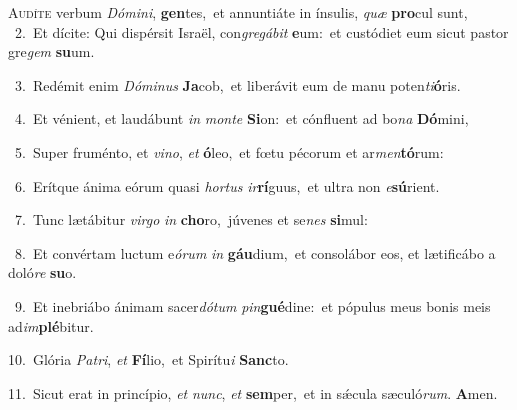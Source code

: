 \lettrine{\initial\textcolor{\initialcolor}{A}}{udíte} verbum \textit{Dó}\-\textit{mi}\textit{ni}, \textbf{gen}\-tes,~\star et annuntiáte in ínsulis, \textit{quæ} \textbf{pro}\-cul sunt,\\
{\numbfont\textcolor{\numbcolor}{~2.}}~Et dícite: Qui dispérsit Israël, con\-\textit{gre}\-\textit{gá}\textit{bit} \textbf{e}\-um:~\star et custódiet eum sicut pastor gre\textit{gem} \textbf{su}\-um.\par
{\numbfont\textcolor{\numbcolor}{~3.}}~Redémit enim \textit{Dó}\-\textit{mi}\textit{nus} \textbf{Ja}\-cob,~\star et liberávit eum de manu poten\-\textit{ti}\-\textbf{ó}ris.\par
{\numbfont\textcolor{\numbcolor}{~4.}}~Et vénient, et laudábunt \textit{in} \textit{mon}\-\textit{te} \textbf{Si}\-on:~\star et cónfluent ad bo\textit{na} \textbf{Dó}\-mini,\par
{\numbfont\textcolor{\numbcolor}{~5.}}~Super fruménto, et \textit{vi}\-\textit{no}, \textit{et} \textbf{ó}\-leo,~\star et fœtu pécorum et ar\-\textit{men}\-\textbf{tó}rum:\par
{\numbfont\textcolor{\numbcolor}{~6.}}~Erítque ánima eórum quasi \textit{hor}\-\textit{tus} \textit{ir}\-\textbf{rí}guus,~\star et ultra non \textit{e}\-\textbf{sú}rient.\par
{\numbfont\textcolor{\numbcolor}{~7.}}~Tunc lætábitur \textit{vir}\-\textit{go} \textit{in} \textbf{cho}\-ro,~\star júvenes et se\textit{nes} \textbf{si}\-mul:\par
{\numbfont\textcolor{\numbcolor}{~8.}}~Et convértam luctum e\-\textit{ó}\-\textit{rum} \textit{in} \textbf{gáu}\-dium,~\star et consolábor eos, et lætificábo a doló\textit{re} \textbf{su}\-o.\par
{\numbfont\textcolor{\numbcolor}{~9.}}~Et inebriábo ánimam sacer\-\textit{dó}\-\textit{tum} \textit{pin}\-\textbf{gué}dine:~\star et pópulus meus bonis meis ad\-\textit{im}\-\textbf{plé}bitur.\par
{\numbfont\textcolor{\numbcolor}{10.}}~Glória \textit{Pa}\-\textit{tri}, \textit{et} \textbf{Fí}\-lio,~\star et Spirítu\textit{i} \textbf{Sanc}\-to.\par
{\numbfont\textcolor{\numbcolor}{11.}}~Sicut erat in princípio, \textit{et} \textit{nunc}\-, \textit{et} \textbf{sem}\-per,~\star et in sǽcula sæculó\-\textit{rum}\-. \textbf{A}\-men.\par
